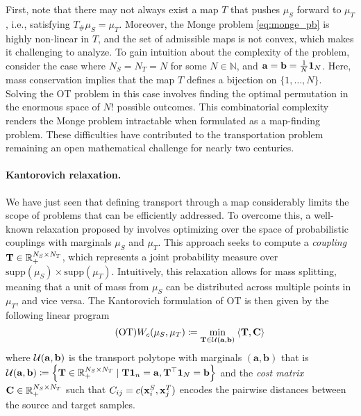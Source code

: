 First, note that there may not always exist a map \(T\) that pushes \(\mu_S\) forward to \(\mu_T\), i.e., satisfying \(T_{\#}\mu_S = \mu_T\). Moreover, the Monge problem \eqref{eq:monge_pb} is highly non-linear in \(T\), and the set of admissible maps is not convex, which makes it challenging to analyze. To gain intuition about the complexity of the problem, consider the case where \(N_S = N_T = N\) for some \(N \in \mathbb{N}\), and \({\mathbf{a}} = {\mathbf{b}} = \frac{1}{N} \mathbf{1}_N\). Here, mass conservation implies that the map \(T\) defines a bijection on \(\{1, \ldots, N\}\). Solving the OT problem in this case involves finding the optimal permutation in the enormous space of \(N!\) possible outcomes. This combinatorial complexity renders the Monge problem intractable when formulated as a map-finding problem. These difficulties have contributed to the transportation problem remaining an open mathematical challenge for nearly two centuries.


\paragraph{Kantorovich relaxation.}
We have just seen that defining transport through a map considerably limits the scope of problems that can be efficiently addressed. To overcome this, a well-known relaxation proposed by \citep{kantorovich1942translocation} involves optimizing over the space of probabilistic couplings with marginals \(\mu_S\) and \(\mu_T\). This approach seeks to compute a \emph{coupling} \({\mathbf{T}} \in \mathbb{R}_{+}^{N_S \times N_T}\), which represents a joint probability measure over \(\text{supp}(\mu_S) \times \text{supp}(\mu_T)\). Intuitively, this relaxation allows for mass splitting, meaning that a unit of mass from \(\mu_S\) can be distributed across multiple points in \(\mu_T\), and vice versa.
The Kantorovich formulation of OT is then given by the following linear program
\begin{equation}
    \tag{OT}
    \label{eq:OT}
    W_c(\mu_S, \mu_T) \coloneqq \min_{{\mathbf{T}} \in {\mathcal{U}}({\mathbf{a}}, {\mathbf{b}})} \: \langle {\mathbf{T}}, {\mathbf{C}} \rangle
\end{equation}
where ${\mathcal{U}}({\mathbf{a}}, {\mathbf{b}})$ is the transport polytope with marginals $(\bm{a}, \bm{b})$ that is ${\mathcal{U}}({\mathbf{a}}, {\mathbf{b}}) \coloneqq \left\{ {\mathbf{T}} \in \mathbb{R}_+^{N_S \times N_T} \mid {\mathbf{T}} \mathbf{1}_n = {\mathbf{a}}, {\mathbf{T}}^\top \mathbf{1}_N = {\mathbf{b}} \right\}$ and the \emph{cost matrix} $\mathbf{C} \in \mathbb{R}_+^{N_S \times N_T}$ such that $C_{ij} = c({\mathbf{x}}_i^S, {\mathbf{x}}_j^T)$ encodes the pairwise distances between the source and target samples. 

